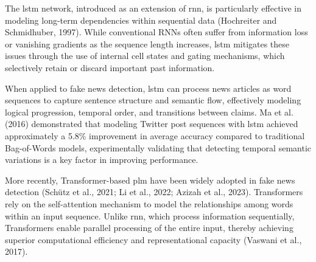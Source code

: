 \documentclass[a4paper,fleqn]{cas-sc}
\begin{document}
The \gls{lstm} network, introduced as an extension of \gls{rnn}, is particularly effective in modeling long-term dependencies within sequential data (Hochreiter and Schmidhuber, 1997). While conventional RNNs often suffer from information loss or vanishing gradients as the sequence length increases, \gls{lstm} mitigates these issues through the use of internal cell states and gating mechanisms, which selectively retain or discard important past information.

When applied to fake news detection, \gls{lstm} can process news articles as word sequences to capture sentence structure and semantic flow, effectively modeling logical progression, temporal order, and transitions between claims. Ma et al. (2016) demonstrated that modeling Twitter post sequences with \gls{lstm} achieved approximately a 5.8\% improvement in average accuracy compared to traditional Bag-of-Words models, experimentally validating that detecting temporal semantic variations is a key factor in improving performance.

More recently, Transformer-based \gls{plm} have been widely adopted in fake news detection (Schütz et al., 2021; Li et al., 2022; Azizah et al., 2023). Transformers rely on the self-attention mechanism to model the relationships among words within an input sequence. Unlike \gls{rnn}, which process information sequentially, Transformers enable parallel processing of the entire input, thereby achieving superior computational efficiency and representational capacity (Vaswani et al., 2017).
\end{document}
